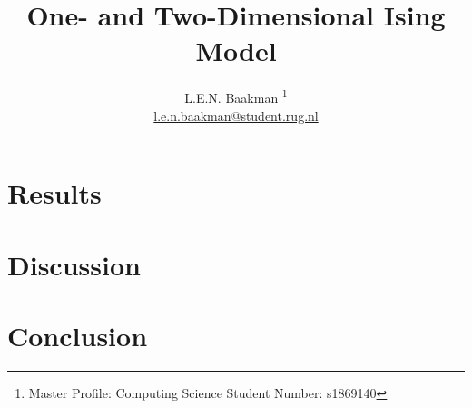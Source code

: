 \documentclass[oneside, a4paper, twocolumn, reqno, fleqn, 11pt]{article}
\title{\sc One- and Two-Dimensional Ising Model}
\author{L.E.N. Baakman%
	\thanks{%
		Master Profile: Computing Science\newline
	 	\hspace*{14pt} Student Number: s1869140%
	}\\%
	\href{mailto:l.e.n.baakman@student.rug.nl}{l.e.n.baakman@student.rug.nl}
}
\begin{document}
\maketitle

% 

% 	

% 	

\section{Results}
\label{s:results}


\section{Discussion}
\label{s:discussion}


\section{Conclusion}
\label{s:conclusion}


\printbibliography

\onecolumn
\allowdisplaybreaks %

% 

% 

% 
\end{document}
